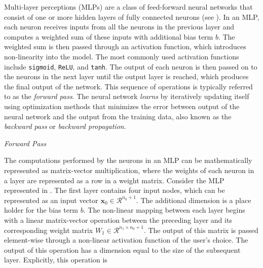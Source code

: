 Multi-layer perceptions (MLPs) are a class of feed-forward neural networks that consist of one or more hidden layers of fully connected neurons (see ). In an MLP, each neuron receives inputs from all the neurons in the previous layer and computes a weighted sum of these inputs with additional bias term $b$. The weighted sum is then passed through an activation function, which introduces non-linearity into the model. The most commonly used activation functions include \texttt{sigmoid}, \texttt{ReLU}, and \texttt{tanh}. The output of each neuron is then passed on to the neurons in the next layer until the output layer is reached, which produces the final output of the network. This sequence of operations is typically referred to as the \textit{forward pass}. The neural network \textit{learns} by iteratively updating itself using optimization methods that minimizes the error between output of the neural network and the output from the training data, also known as the \textit{backward pass} or \textit{backward propagation}. 

\vspace{0.5cm}
\noindent \textit{Forward Pass} 
\vspace{0.25cm}

The computations performed by the neurons in an MLP can be mathematically represented as matrix-vector multiplication, where the weights of each neuron in a layer are represented as a row in a weight matrix. Consider the MLP represented in . The first layer contains four input nodes, which can be represented as an input vector $\boldsymbol{x}_0 \in \mathcal{R}^{n_0 + 1}$. The additional dimension is a place holder for the bias term $b$. The non-linear mapping between each layer begins with a linear matrix-vector operation between the preceding layer and its corresponding weight matrix $W_1 \in \mathcal{R}^{n_1 \times n_0 + 1}$. The output of this matrix is passed element-wise through a non-linear activation function of the user's choice. The output of this operation has a dimension equal to the size of the subsequent layer. Explicitly, this operation is

